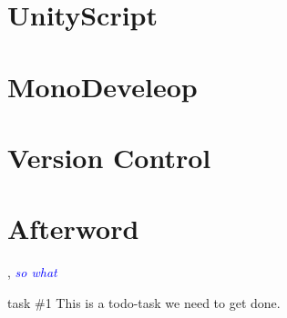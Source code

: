 \documentclass[BSP,english,oneside]{classes/gucthesis}
\newcommand{\comment}[1]{\textcolor{blue}{\emph{#1}}}
\newcommand{\todo}[1]{{\color{green}#1}}
\begin{document}
\chapter{UnityScript}
	\label{chap:UnityScript}
	


\chapter{MonoDeveleop}
	\label{chap:MonoDevelop}
	


\chapter{Version Control}
	\label{chap:VersionControl}
	


\chapter{Afterword}
	\label{chap:afterword}
	






\appendix %
\appendixpage
\addappheadtotoc







\GUC, 
\comment{so what}

\todo{task \#1}
This is a todo-task we need to get done.
\end{document}
